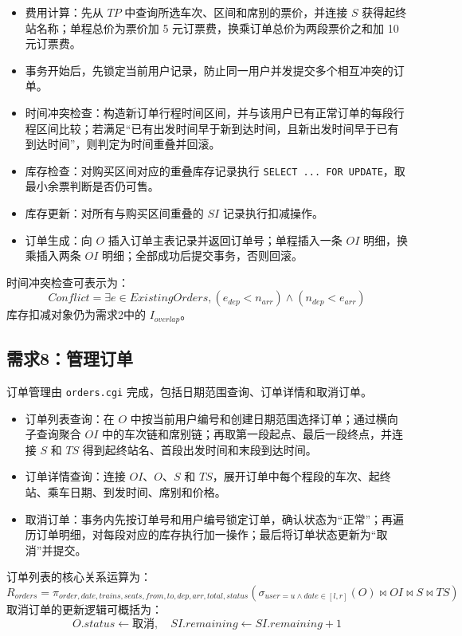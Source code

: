\documentclass[10pt,a4paper]{article}
\begin{document}
\begin{itemize}
    \item 费用计算：先从 $TP$ 中查询所选车次、区间和席别的票价，并连接 $S$ 获得起终站名称；单程总价为票价加 5 元订票费，换乘订单总价为两段票价之和加 10 元订票费。
    \item 事务开始后，先锁定当前用户记录，防止同一用户并发提交多个相互冲突的订单。
    \item 时间冲突检查：构造新订单行程时间区间，并与该用户已有正常订单的每段行程区间比较；若满足“已有出发时间早于新到达时间，且新出发时间早于已有到达时间”，则判定为时间重叠并回滚。
    \item 库存检查：对购买区间对应的重叠库存记录执行 \texttt{SELECT ... FOR UPDATE}，取最小余票判断是否仍可售。
    \item 库存更新：对所有与购买区间重叠的 $SI$ 记录执行扣减操作。
    \item 订单生成：向 $O$ 插入订单主表记录并返回订单号；单程插入一条 $OI$ 明细，换乘插入两条 $OI$ 明细；全部成功后提交事务，否则回滚。
\end{itemize}

时间冲突检查可表示为：
\[
Conflict=\exists e\in ExistingOrders,
(e_{dep}<n_{arr})\land(n_{dep}<e_{arr})
\]
库存扣减对象仍为需求2中的 $I_{overlap}$。

\subsection{需求8：管理订单}

订单管理由 \texttt{orders.cgi} 完成，包括日期范围查询、订单详情和取消订单。

\begin{itemize}
    \item 订单列表查询：在 $O$ 中按当前用户编号和创建日期范围选择订单；通过横向子查询聚合 $OI$ 中的车次链和席别链；再取第一段起点、最后一段终点，并连接 $S$ 和 $TS$ 得到起终站名、首段出发时间和末段到达时间。
    \item 订单详情查询：连接 $OI$、$O$、$S$ 和 $TS$，展开订单中每个程段的车次、起终站、乘车日期、到发时间、席别和价格。
    \item 取消订单：事务内先按订单号和用户编号锁定订单，确认状态为“正常”；再遍历订单明细，对每段对应的库存执行加一操作；最后将订单状态更新为“取消”并提交。
\end{itemize}

订单列表的核心关系运算为：
\[
R_{orders}=\pi_{order,date,trains,seats,from,to,dep,arr,total,status}
(\sigma_{user=u\land date\in[l,r]}(O) \bowtie OI \bowtie S \bowtie TS)
\]
取消订单的更新逻辑可概括为：
\[
O.status \leftarrow \text{取消},\quad SI.remaining \leftarrow SI.remaining+1
\]
\end{document}
